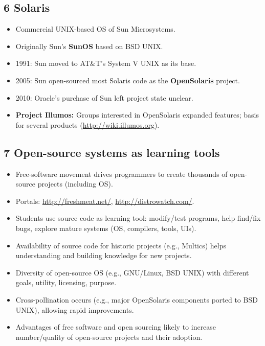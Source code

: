 \documentclass{article}
\begin{document}
\subsection*{6 Solaris}
\begin{itemize}
    \item Commercial UNIX-based OS of Sun Microsystems.
    \item Originally Sun's \textbf{SunOS} based on BSD UNIX.
    \item 1991: Sun moved to AT\&T's System V UNIX as its base.
    \item 2005: Sun open-sourced most Solaris code as the \textbf{OpenSolaris} project.
    \item 2010: Oracle's purchase of Sun left project state unclear.
    \item \textbf{Project Illumos:} Groups interested in OpenSolaris expanded features; basis for several products (\url{http://wiki.illumos.org}).
\end{itemize}

\subsection*{7 Open-source systems as learning tools}
\begin{itemize}
    \item Free-software movement drives programmers to create thousands of open-source projects (including OS).
    \item Portals: \url{http://freshmeat.net/}, \url{http://distrowatch.com/}.
    \item Students use source code as learning tool: modify/test programs, help find/fix bugs, explore mature systems (OS, compilers, tools, UIs).
    \item Availability of source code for historic projects (e.g., Multics) helps understanding and building knowledge for new projects.
    \item Diversity of open-source OS (e.g., GNU/Linux, BSD UNIX) with different goals, utility, licensing, purpose.
    \item Cross-pollination occurs (e.g., major OpenSolaris components ported to BSD UNIX), allowing rapid improvements.
    \item Advantages of free software and open sourcing likely to increase number/quality of open-source projects and their adoption.
\end{itemize}
\end{document}
